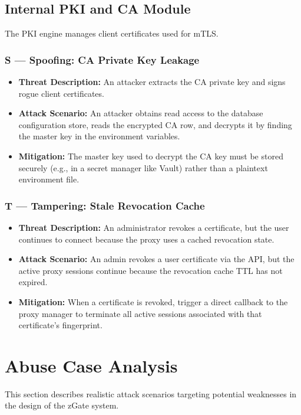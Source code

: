 \subsection{Internal PKI and CA Module}

The PKI engine manages client certificates used for mTLS.

\subsubsection{S --- Spoofing: CA Private Key Leakage}
\begin{itemize}[leftmargin=*]
    \item \textbf{Threat Description:} An attacker extracts the CA private key and signs rogue client certificates.
    \item \textbf{Attack Scenario:} An attacker obtains read access to the database configuration store, reads the encrypted CA row, and decrypts it by finding the master key in the environment variables.
    \item \textbf{Mitigation:} The master key used to decrypt the CA key must be stored securely (e.g., in a secret manager like Vault) rather than a plaintext environment file.
\end{itemize}

\subsubsection{T --- Tampering: Stale Revocation Cache}
\begin{itemize}[leftmargin=*]
    \item \textbf{Threat Description:} An administrator revokes a certificate, but the user continues to connect because the proxy uses a cached revocation state.
    \item \textbf{Attack Scenario:} An admin revokes a user certificate via the API, but the active proxy sessions continue because the revocation cache TTL has not expired.
    \item \textbf{Mitigation:} When a certificate is revoked, trigger a direct callback to the proxy manager to terminate all active sessions associated with that certificate's fingerprint.
\end{itemize}

\section{Abuse Case Analysis}

This section describes realistic attack scenarios targeting potential weaknesses in the design of the zGate system.

